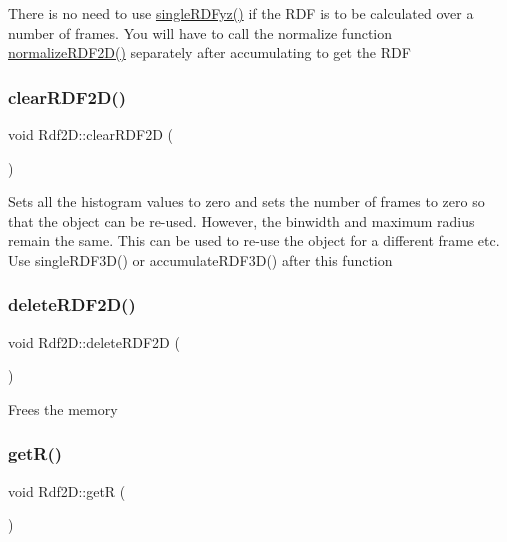 There is no need to use \mbox{\hyperlink{classRdf2D_a4e77d415c344954480a121f79a4aab6b}{single\+R\+D\+Fyz()}} if the R\+DF is to be calculated over a number of frames. You will have to call the normalize function \mbox{\hyperlink{classRdf2D_aaf6d00ec728e8c694ed2932332691c0d}{normalize\+R\+D\+F2\+D()}} separately after accumulating to get the R\+DF \mbox{\label{classRdf2D_a9658a9bb2229afda0d743bdc05a27411}} 
\subsubsection{\texorpdfstring{clear\+R\+D\+F2\+D()}{clearRDF2D()}}
{\footnotesize\ttfamily void Rdf2\+D\+::clear\+R\+D\+F2D (\begin{DoxyParamCaption}{ }\end{DoxyParamCaption})}

Sets all the histogram values to zero and sets the number of frames to zero so that the object can be re-\/used. However, the binwidth and maximum radius remain the same. This can be used to re-\/use the object for a different frame etc. Use single\+R\+D\+F3\+D() or accumulate\+R\+D\+F3\+D() after this function \mbox{\label{classRdf2D_a8008421c8aedff5887160b455879d36b}} 
\subsubsection{\texorpdfstring{delete\+R\+D\+F2\+D()}{deleteRDF2D()}}
{\footnotesize\ttfamily void Rdf2\+D\+::delete\+R\+D\+F2D (\begin{DoxyParamCaption}{ }\end{DoxyParamCaption})}

Frees the memory \mbox{\label{classRdf2D_a3c8153b303733b7e5d320f9b20f37b32}} 
\subsubsection{\texorpdfstring{get\+R()}{getR()}}
{\footnotesize\ttfamily void Rdf2\+D\+::getR (\begin{DoxyParamCaption}{ }\end{DoxyParamCaption})}

